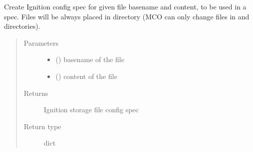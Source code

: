 \documentclass[letterpaper,10pt,english]{sphinxmanual}
\begin{document}
\begin{fulllineitems}
\label{\detokenize{ocpnetsplit:ocpnetsplit.machineconfig.create_file_dict}}
Create Ignition config spec for given file basename and content, to be used
in a  spec. Files will be always placed in 
directory (MCO can only change files in  and  directories).
\begin{quote}\begin{description}
\item[{Parameters}] \leavevmode\begin{itemize}
\item {} 
 () \textendash{} basename of the file

\item {} 
 () \textendash{} content of the file

\end{itemize}

\item[{Returns}] \leavevmode
Ignition storage file config spec

\item[{Return type}] \leavevmode
dict

\end{description}\end{quote}

\end{fulllineitems}

\end{document}
